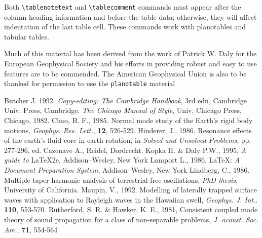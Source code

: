 \documentclass[extra,mreferee]{gji}
\begin{document}
Both \verb"\tablenotetext" and \verb"\tablecomment" 
commands must appear after the column heading information
and before the table data; otherwise, they will affect
indentation of the last table cell.  These commands 
work with planotables and tabular tables.


\begin{acknowledgments}
Much of this material has been derived from the work of Patrick W. Daly
for the European Geophysical Society and his efforts in providing
robust and easy to use features are to be commended.  The American
Geophysical Union is also to be thanked for permission to use the
\verb"planotable"  material
\end{acknowledgments}

\begin{thebibliography}{}  
    Butcher J. 1992. {\it Copy-editing: The Cambridge  
    Handbook}, 3rd edn, Cambridge Univ. Press, Cambridge.
    {\it The Chicago Manual of Style}, Univ.   
    Chicago Press, Chicago, 1982.
    Chao, B. F., 1985. Normal mode study of the Earth's rigid 
     body motions, {\it Geophys. Res. Lett.}, {\bf 12}, 526-529.
    Hinderer, J., 1986. Resonance effects of the earth's fluid
    core in earth rotation, in {\it Solved and Unsolved 
    Problems}, pp. 277-296, ed. Cazenave A., Reidel, 
    Dordrecht.
    Kopka H. \& Daly P.W., 1995, \textit{A guide to} \LaTeX2e,
    Addison--Wesley, New York  
    Lamport L., 1986,  \LaTeX: {\it A Document   
    Preparation System}, Addison--Wesley, New York  
    Lindberg, C., 1986.  Multiple taper harmonic analysis of 
    terrestrial free oscillations, {\it PhD thesis}, 
    University of California.
    Maupin, V., 1992. Modelling of laterally trapped surface 
    waves with application to Rayleigh waves in the Hawaiian 
    swell, {\it Geophys. J. Int.}. {\bf 110}, 553-570.     	
      Rutherford, S. R. \& Hawker, K. E., 1981, 
    Consistent coupled mode theory of sound propagation for a 
    class of non-separable problems, 
   {\it J. acoust. Soc. Am.}, {\bf 71}, 554-564
\end{thebibliography}  
  
\end{document}
